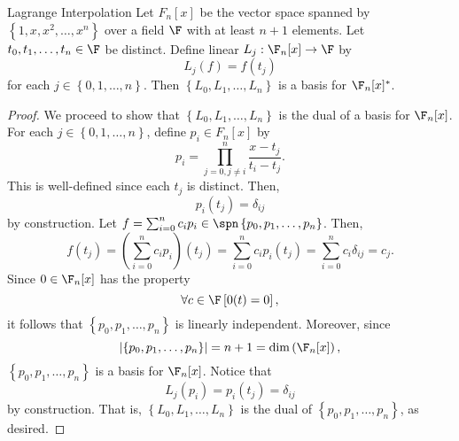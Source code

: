 \documentclass[linearalgebraII]{subfiles}
\begin{document}
    \begin{theorem}{Lagrange Interpolation}
        Let $F_n[x]$ be the vector space spanned by $\left\lbrace 1, x, x^2, \ldots, x^n \right\rbrace$ over a field $\F$ with at least $n+1$ elements. Let $t_0, t_1, \ldots, t_n\in \F$ be distinct. Define linear $L_j: \F_n[x]\to \F$ by
        \begin{equation*}
            L_j(f) = f(t_j)
        \end{equation*}
        for each $j\in \left\lbrace 0, 1, \ldots, n \right\rbrace$. Then $\left\lbrace L_0, L_1, \ldots, L_n \right\rbrace$ is a basis for $\F_n[x]^*$.
    \end{theorem}

    \begin{proof}
        We proceed to show that $\left\lbrace L_0, L_1, \ldots, L_n \right\rbrace$ is the dual of a basis for $\F_n[x]$. For each $j\in \left\lbrace 0, 1, \ldots, n \right\rbrace$, define $p_i\in F_n[x]$ by
        \begin{equation*}
            p_i = \prod^n_{j=0,j\neq i} \frac{x-t_j}{t_i-t_j}.
        \end{equation*}
        This is well-defined since each $t_j$ is distinct. Then,
        \begin{equation*}
            p_i(t_j) = \delta_{ij}
        \end{equation*}
        by construction. Let $f = \sum^n_{i=0} c_ip_i\in \spn \left\lbrace p_0, p_1, \ldots, p_n \right\rbrace$. Then,
        \begin{equation*}
            f(t_j) = \left( \sum^n_{i=0} c_ip_i \right)(t_j) = \sum^n_{i=0} c_ip_i(t_j) = \sum^n_{i=0} c_i\delta_{ij} = c_j.
        \end{equation*}
        Since $0\in \F_n[x]$ has the property
        \begin{equation*}
            \forall c\in \F \left[ 0(t) = 0 \right], 
        \end{equation*}
        it follows that $\left\lbrace p_0, p_1, \ldots, p_n \right\rbrace$ is linearly independent. Moreover, since
        \begin{equation*}
            \left| \left\lbrace p_0, p_1, \ldots, p_n \right\rbrace  \right| = n+1 = \dim \left( \F_n[x] \right), 
        \end{equation*}
        $\left\lbrace p_0, p_1, \ldots, p_n \right\rbrace$ is a basis for $\F_n[x]$. Notice that
        \begin{equation*}
            L_j(p_i) = p_i(t_j) = \delta_{ij}
        \end{equation*}
        by construction. That is, $\left\lbrace L_0, L_1, \ldots, L_n \right\rbrace$ is the dual of $\left\lbrace p_0, p_1, \ldots, p_n \right\rbrace$, as desired.
    \end{proof}
\end{document}
